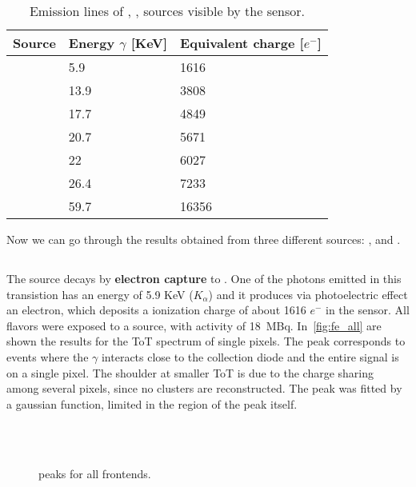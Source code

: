 \begin{table}[h!]
\centering
\begin{tabular}{>{} C{3cm}|C{2.8cm}|C{2.8cm}}
Source & Energy $\gamma$ [KeV] & Equivalent charge [$e^{-}$]\\[2ex]
\hline
{} & 5.9 & 1616\\[0.5ex]
\hline
{} & 13.9 & 3808\\[0.5ex]
\hline
{} & 17.7 & 4849\\[0.5ex]
\hline
{} & 20.7 & 5671\\[0.5ex]
\hline
{} & 22 & 6027\\[0.5ex]
\hline
{} & 26.4 & 7233\\[0.5ex]
\hline
{} & 59.7 & 16356\\
\hline
\end{tabular}
\caption{Emission lines of , ,  sources visible by the sensor.}
\label{tab:radio_sources}
\end{table}


Now we can go through the results obtained from three different sources: ,  and .
\subsection{}

The  source decays by \textbf{electron capture} to . One of the photons emitted in this transistion has an energy of 5.9 KeV ($K_{\alpha}$) and it produces via photoelectric effect an electron, which deposits a ionization charge of about 1616 $e^{-}$ in the sensor. 
All flavors were exposed to a  source, with activity of \SI{18}{MBq}. In~\autoref{fig:fe_all} are shown the results for the ToT spectrum of single pixels. The peak corresponds to events where the $\gamma$ interacts close to the collection diode and the entire signal is on a single pixel. The shoulder at smaller ToT is due to the charge sharing among several pixels, since no clusters are reconstructed. The peak was fitted by a gaussian function, limited in the region of the peak itself. 

\begin{figure}[h!]
\centering
{}\quad
{}\\
\quad
{}\\
\caption{ peaks for all frontends.}
\label{fig:fe_all}
\end{figure}

